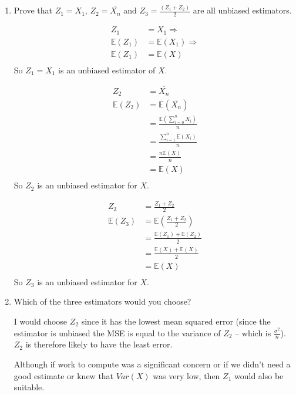 \documentclass[10pt,\jkfside,a4paper]{article}
\begin{document}
\begin{enumerate}
\begin{enumerate}

\item Prove that $Z_1 = X_1$, $Z_2 = \overline{X_n}$ and $Z_3 = \frac{(Z_1 + Z_2)}{2}$ are all unbiased estimators.

\[
\begin{split}
Z_1 &= X_1 \Longrightarrow \\
\mathbb{E}(Z_1) &= \mathbb{E}(X_1) \Longrightarrow \\
\mathbb{E}(Z_1) &= \mathbb{E}(X) \\
\end{split}
\]
So $Z_1 = X_1$ is an unbiased estimator of $X$.

\[
\begin{split}
Z_2 &= \overline{X_n} \\
\mathbb{E}(Z_2) &= \mathbb{E}\left( \overline{X_n} \right) \\
&= \frac{\mathbb{E}\left(\sum^{n}_{i=0} X_i\right)}{n} \\
&= \frac{\sum^{n}_{i=1} \mathbb{E}(X_i)}{n} \\
&= \frac{n \mathbb{E}(X)}{n} \\
&= \mathbb{E}(X) \\
\end{split}
\]
So $Z_2$ is an unbiased estimator for $X$.

\[
\begin{split}
Z_3 &= \frac{Z_1 + Z_2}{2} \\
\mathbb{E}(Z_3) &= \mathbb{E}\left(\frac{Z_1 + Z_2}{2}\right) \\
&= \frac{\mathbb{E}(Z_1) + \mathbb{E}(Z_2)}{2} \\
&= \frac{\mathbb{E}(X) + \mathbb{E}(X)}{2} \\
&= \mathbb{E}(X) \\
\end{split}
\]
So $Z_3$ is an unbiased estimator for $X$.

\item Which of the three estimators would you choose?

I would choose $Z_2$ since it has the lowest mean squared error (since the 
estimator is unbiased the MSE is equal to the variance of $Z_2$ -- which is $\frac{\sigma^2}{n}$).
$Z_2$ is therefore likely to have the least error.

Although if work to compute was a significant concern or if we didn't need a
good estimate or knew that $Var(X)$ was very low, then $Z_1$ would
also be suitable.


\end{enumerate}
\end{enumerate}
\end{document}
